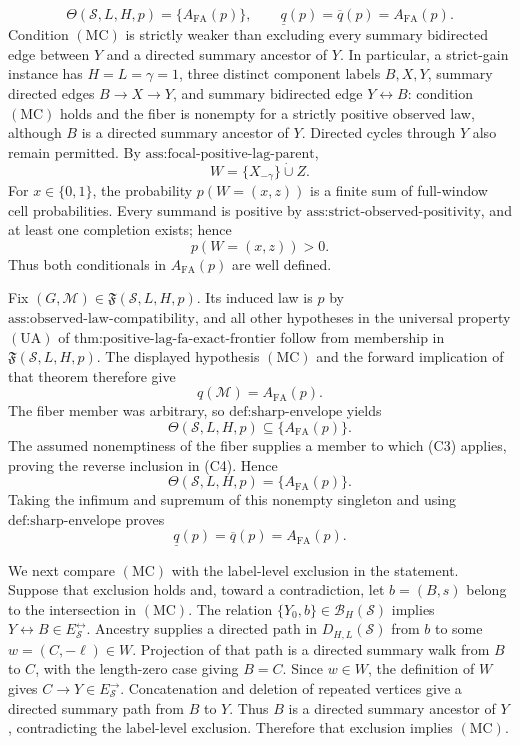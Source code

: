 \[
\Theta(\mathcal S,L,H,p)=\{A_{\mathrm{FA}}(p)\},
\qquad
\underline q(p)=\overline q(p)=A_{\mathrm{FA}}(p).
\]
Condition \(\mathrm{(MC)}\) is strictly weaker than excluding every summary bidirected edge between \(Y\) and a directed summary ancestor of \(Y\).  In particular, a strict-gain instance has \(H=L=\gamma=1\), three distinct component labels \(B,X,Y\), summary directed edges \(B\to X\to Y\), and summary bidirected edge \(Y\leftrightarrow B\): condition \(\mathrm{(MC)}\) holds and the fiber is nonempty for a strictly positive observed law, although \(B\) is a directed summary ancestor of \(Y\).  Directed cycles through \(Y\) also remain permitted.
By \(\text{ass:focal-positive-lag-parent}\),
\[
W=\{X_{-\gamma}\}\mathbin{\dot\cup}Z.
\tag{C1}
\]
For \(x\in\{0,1\}\), the probability \(p(W=(x,z))\) is a finite sum of full-window cell probabilities.  Every summand is positive by \(\text{ass:strict-observed-positivity}\), and at least one completion exists; hence
\[
p(W=(x,z))>0.
\tag{C2}
\]
Thus both conditionals in \(A_{\mathrm{FA}}(p)\) are well defined.

Fix \((G,\mathcal M)\in\mathfrak F(\mathcal S,L,H,p)\).  Its induced law is \(p\) by \(\text{ass:observed-law-compatibility}\), and all other hypotheses in the universal property \(\mathrm{(UA)}\) of \(\text{thm:positive-lag-fa-exact-frontier}\) follow from membership in \(\mathfrak F(\mathcal S,L,H,p)\).  The displayed hypothesis \(\mathrm{(MC)}\) and the forward implication of that theorem therefore give
\[
q(\mathcal M)=A_{\mathrm{FA}}(p).
\tag{C3}
\]
The fiber member was arbitrary, so \(\text{def:sharp-envelope}\) yields
\[
\Theta(\mathcal S,L,H,p)\subseteq\{A_{\mathrm{FA}}(p)\}.
\tag{C4}
\]
The assumed nonemptiness of the fiber supplies a member to which (C3) applies, proving the reverse inclusion in (C4).  Hence
\[
\Theta(\mathcal S,L,H,p)=\{A_{\mathrm{FA}}(p)\}.
\tag{C5}
\]
Taking the infimum and supremum of this nonempty singleton and using \(\text{def:sharp-envelope}\) proves
\[
\underline q(p)=\overline q(p)=A_{\mathrm{FA}}(p).
\tag{C6}
\]

We next compare \(\mathrm{(MC)}\) with the label-level exclusion in the statement.  Suppose that exclusion holds and, toward a contradiction, let \(b=(B,s)\) belong to the intersection in \(\mathrm{(MC)}\).  The relation \(\{Y_0,b\}\in\mathcal B_H(\mathcal S)\) implies \(Y\leftrightarrow B\in E_{\mathcal S}^{\leftrightarrow}\).  Ancestry supplies a directed path in \(D_{H,L}(\mathcal S)\) from \(b\) to some \(w=(C,-\ell)\in W\).  Projection of that path is a directed summary walk from \(B\) to \(C\), with the length-zero case giving \(B=C\).  Since \(w\in W\), the definition of \(W\) gives \(C\to Y\in E_{\mathcal S}^{\to}\).  Concatenation and deletion of repeated vertices give a directed summary path from \(B\) to \(Y\).  Thus \(B\) is a directed summary ancestor of \(Y\), contradicting the label-level exclusion.  Therefore that exclusion implies \(\mathrm{(MC)}\).

